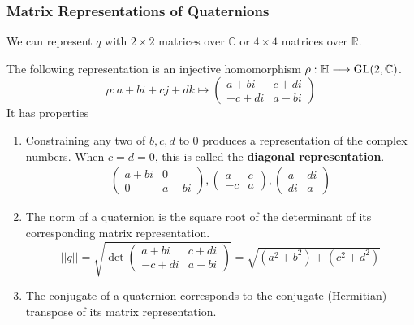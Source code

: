   \subsubsection{Matrix Representations of Quaternions}

    We can represent $q$ with $2 \times 2$ matrices over $\mathbb{C}$ or $4\times 4 $ matrices over $\mathbb{R}$. 

    \begin{theorem}
      The following representation is an injective homomorphism $\rho: \mathbb{H} \longrightarrow \GL(2, \mathbb{C})$. 
      \begin{equation}
        \rho: a + bi + cj + dk \mapsto \begin{pmatrix}
        a+bi & c+ di \\ -c + di & a - bi
        \end{pmatrix}
      \end{equation}
      It has properties
      \begin{enumerate}
        \item Constraining any two of $b, c, d$ to $0$ produces a representation of the complex numbers. When $c = d = 0$, this is called the \textbf{diagonal representation}. 
        \begin{align*}
          \begin{pmatrix}
          a+bi & 0 \\ 0 & a-bi
          \end{pmatrix},  \begin{pmatrix}
          a & c \\ -c & a
          \end{pmatrix},  \begin{pmatrix}
          a & di \\ di & a
          \end{pmatrix}
        \end{align*}
        \item The norm of a quaternion is the square root of the determinant of its corresponding matrix representation. 
          \begin{equation}
            ||q|| = \sqrt{\det \begin{pmatrix}
            a+bi & c+di \\ -c+di & a-bi
            \end{pmatrix}} = \sqrt{(a^2 + b^2) + (c^2 + d^2)}
          \end{equation}
        \item The conjugate of a quaternion corresponds to the conjugate (Hermitian) transpose of its matrix representation. 

\end{enumerate}
\end{theorem}
